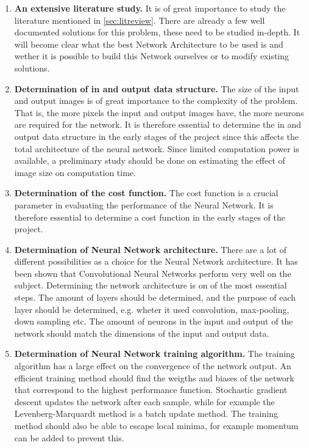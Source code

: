 \begin{enumerate}
\item	\textbf{An extensive literature study.}
It is of great importance to study the literature mentioned in \ref{sec:litreview}. There are already a few well documented solutions for this problem, these need to be studied in-depth. It will become clear what the best Network Architecture to be used is and wether it is possible to build this Network ourselves or to modify existing solutions.

\item \textbf{Determination of in and output data structure.}
The size of the input and output images is of great importance to the complexity of the problem. That is, the more pixels the input and output images have, the more neurons are required for the network. It is therefore essential to determine the in and output data structure in the early stages of the project since this affects the total architecture of the neural network. Since limited computation power is available, a preliminary study should be done on estimating the effect of image size on computation time. 

\item \textbf{Determination of the cost function.}
The cost function is a crucial parameter in evaluating the performance of the Neural Network. It is therefore essential to determine a cost function in the early stages of the project.

\item \textbf{Determination of Neural Network architecture.}
There are a lot of different possibilities as a choice for the Neural Network architecture. It has been shown \cite{AutomaticColorization} that Convolutional Neural Networks perform very well on the subject. Determining the network architecture is on of the most essential steps. The amount of layers should be determined, and the purpose of each layer should be determined, e.g. wheter it used convolution, max-pooling, down sampling etc. The amount of neurons in the input and output of the network should match the dimensions of the input and output data. 

\item \textbf{Determination of Neural Network training algorithm.}
The training algorithm has a large effect on the convergence of the network output. An efficient training method should find the  weigths and biases of the network that correspond to the highest performance function. Stochastic gradient descent updates the network after each sample, while for example the Levenberg-Marquardt method is a batch update method. The training method should also be able to escape local minima, for example momentum can be added to prevent this.


\end{enumerate}
